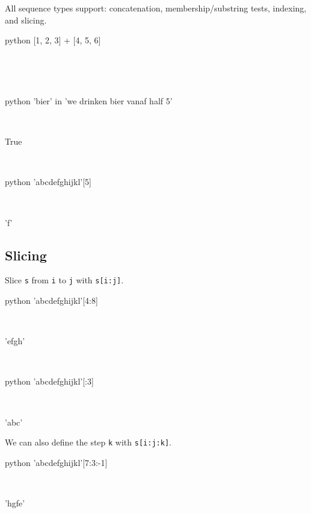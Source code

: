 \documentclass[aspectratio=1610,slidestop]{beamer}
\begin{document}
\begin{pframe}
 All sequence types support: concatenation, membership/substring tests,
 indexing, and slicing.
 \\
 \begin{ipython}
  \begin{pythonin}{python}
[1, 2, 3] + [4, 5, 6]
  \end{pythonin}
  \\
  \begin{pythonout}
[1, 2, 3, 4, 5, 6]
  \end{pythonout}
  \\

  \begin{pythonin}{python}
'bier' in 'we drinken bier vanaf half 5'
  \end{pythonin}
  \\
  \begin{pythonout}
True
  \end{pythonout}
  \\

  \begin{pythonin}{python}
'abcdefghijkl'[5]
  \end{pythonin}
  \\
  \begin{pythonout}
'f'
  \end{pythonout}
 \end{ipython}
\end{pframe}


\subsection{Slicing}
\begin{pframe}
 Slice \texttt{s} from \texttt{i} to
 \texttt{j} with \texttt{s[i:j]}.
 \begin{ipython}
  \begin{pythonin}{python}
'abcdefghijkl'[4:8]
  \end{pythonin}
  \\
  \begin{pythonout}
'efgh'
  \end{pythonout}
  \\

  \begin{pythonin}{python}
'abcdefghijkl'[:3]
  \end{pythonin}
  \\
  \begin{pythonout}
'abc'
  \end{pythonout}
 \end{ipython}

 We can also define the step \texttt{k} with
 \texttt{s[i:j:k]}.
 \begin{ipython}
  \begin{pythonin}{python}
'abcdefghijkl'[7:3:-1]
  \end{pythonin}
  \\
  \begin{pythonout}
'hgfe'
  \end{pythonout}
 \end{ipython}
\end{pframe}
\end{document}
